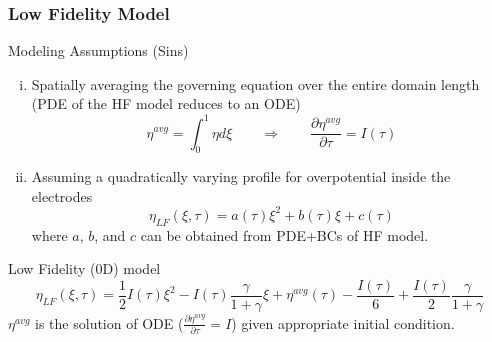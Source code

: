 \documentclass[10pt,xcolor=dvipsnames,compress]{beamer}
\begin{document}
\begin{frame}
\frametitle{Low Fidelity Model}
\vfill


\begin{alertblock}{Modeling Assumptions (Sins)}
\begin{enumerate}[i.]

\item Spatially
averaging the governing equation over the entire domain length (PDE of the HF model reduces to an ODE) 
%
\begin{equation*}\label{eq:LF_avg}
\eta^{avg} = \int_0^1 \eta d\xi \qquad \Rightarrow \qquad
\frac{\partial{\eta}^{avg}}{\partial\tau} = I(\tau)
\end{equation*}

\item Assuming a quadratically varying profile for overpotential inside the electrodes
\begin{equation*}\label{eq:quadratic}
\eta_{LF} (\xi,\tau)= a(\tau)\xi^2 + b(\tau)\xi + c(\tau)
\end{equation*}
where $a$, $b$, and $c$ can be obtained from PDE+BCs of HF model.

\end{enumerate}
\end{alertblock}

\begin{block}{Low Fidelity (0D) model}
\begin{equation*}\label{eq:LF}
\eta_{LF}(\xi,\tau) = 
\frac{1}{2}I(\tau)\xi^2 - I(\tau) \frac{\gamma}{1+\gamma}\xi + {\eta}^{avg}(\tau) - \frac{I(\tau)}{6} + \frac{I(\tau)}{2}\frac{\gamma}{1+\gamma}
\end{equation*}
${\eta}^{avg}$ is the solution of ODE ($\frac{\partial{\eta}^{avg}}{\partial\tau} = I$) given appropriate initial condition.
\end{block}


\vfill
\end{frame}
\end{document}
